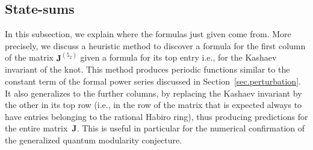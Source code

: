 \documentclass[pdftex]{sigma}
\numberwithin{equation}{section}
\def\a{\alpha}
\def\a{\alpha}
\def\s{\sigma}
\def\bJ{J} \def\bJ{\mathbf{J}}
\begin{document}
\subsection{State-sums}
\label{sub.statesum}

In this subsection, we explain where the formulas just given come from. More precisely,
we discuss a heuristic method to discover a formula for the first column of the
matrix $\bJ^{(5_2)}$ given a formula for its top entry i.e., for the Kashaev invariant
of the knot. This method produces periodic functions similar to the constant term of
the formal power series \smash{$\Phi^{(\s)}_\a(h)$} discussed in Section~\ref{sec.perturbation}.
It also generalizes to the further columns, by replacing the Kashaev invariant by
the other in its top row (i.e., in the row of the matrix that is expected always to
have entries belonging to the rational Habiro ring), thus producing predictions for
the entire matrix~$\bJ$. This is useful in particular for the numerical confirmation
of the generalized quantum modularity conjecture.
\end{document}
